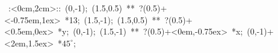 \hbox{
\xy    <2cm,0cm>:<0cm,2cm>::
       (0,-1); (1.5,0.5) **\dir{-}  ?(0.5)+<-0.75em,1ex> *{13};
       (1.5,-1); (1.5,0.5) **\dir{-}  ?(0.5)+<0.5em,0ex> *{y};
       (0,-1); (1.5,-1) **\dir{-}    ?(0.5)+<0em,-0.75ex> *{x};
	   (0,-1)+<2em,1.5ex> *{\hbox{$45^{\circ}$}};
       \endxy}
